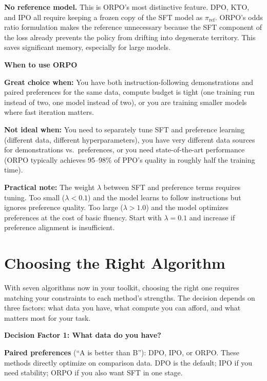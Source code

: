 \begin{chapterenv}
\textbf{No reference model.} This is ORPO's most distinctive feature. DPO, KTO, and IPO all require keeping a frozen copy of the SFT model as $\pi_{\text{ref}}$. ORPO's odds ratio formulation makes the reference unnecessary because the SFT component of the loss already prevents the policy from drifting into degenerate territory. This saves significant memory, especially for large models.

\begin{tipbox}
\textbf{When to use ORPO}

\textbf{Great choice when:} You have both instruction-following demonstrations and paired preferences for the same data, compute budget is tight (one training run instead of two, one model instead of two), or you are training smaller models where fast iteration matters.

\textbf{Not ideal when:} You need to separately tune SFT and preference learning (different data, different hyperparameters), you have very different data sources for demonstrations vs.\ preferences, or you need state-of-the-art performance (ORPO typically achieves 95--98\% of PPO's quality in roughly half the training time).

\textbf{Practical note:} The weight $\lambda$ between SFT and preference terms requires tuning. Too small ($\lambda < 0.1$) and the model learns to follow instructions but ignores preference quality. Too large ($\lambda > 1.0$) and the model optimizes preferences at the cost of basic fluency. Start with $\lambda = 0.1$ and increase if preference alignment is insufficient.
\end{tipbox}

\section{Choosing the Right Algorithm}

With seven algorithms now in your toolkit, choosing the right one requires matching your constraints to each method's strengths. The decision depends on three factors: what data you have, what compute you can afford, and what matters most for your task.

\begin{infobox}
\textbf{Decision Factor 1: What data do you have?}

\textbf{Paired preferences} (``A is better than B''): DPO, IPO, or ORPO. These methods directly optimize on comparison data. DPO is the default; IPO if you need stability; ORPO if you also want SFT in one stage.


\end{infobox}
\end{chapterenv}
